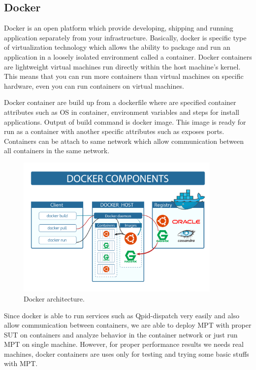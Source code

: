 \subsection{Docker}
Docker \cite{Docker} is an open platform which provide developing, shipping and running application separately from your infrastructure. Basically, docker is specific type of virtualization technology which allows the ability to package and run an application in a loosely isolated environment called a container. Docker containers are lightweight virtual machines run directly within the host machine's kernel. This means that you can run more containers than virtual machines on specific hardware, even you can run containers on virtual machines.

Docker container are build up from a dockerfile where are specified container attributes such as OS in container, environment variables and steps for install applications. Output of build command is docker image. This image is ready for run as a container with another specific attributes such as exposes ports. Containers can be attach to same network which allow communication between all containers in the same network.

\begin{figure}[H]
  \centering
  \includegraphics[width=10cm]{obrazky-figures/docker.png}
  \caption{Docker architecture. }
  \label{fig:ansible_architecture}
\end{figure}


Since docker is able to run services such as Qpid-dispatch very easily and also allow communication between containers, we are able to deploy MPT with proper SUT on containers and analyze behavior in the container network or just run MPT on single machine. However, for proper performance results we needs real machines, docker containers are uses only for testing and trying some basic stuffs with MPT.


